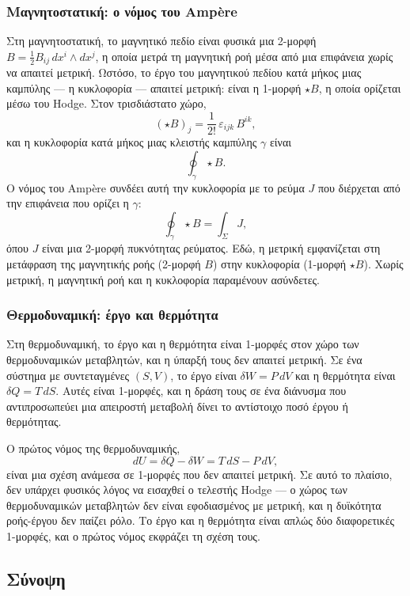 \documentclass[12pt]{article}
\begin{document}
\subsubsection{Μαγνητοστατική: ο νόμος του Amp\`ere}

Στη μαγνητοστατική, το μαγνητικό πεδίο είναι φυσικά μια 2-μορφή $B = \frac{1}{2} B_{ij} \, dx^i \wedge dx^j$, η οποία μετρά τη μαγνητική ροή μέσα από μια επιφάνεια χωρίς να απαιτεί μετρική. Ωστόσο, το έργο του μαγνητικού πεδίου κατά μήκος μιας καμπύλης — η κυκλοφορία — απαιτεί μετρική: είναι η 1-μορφή $\star B$, η οποία ορίζεται μέσω του Hodge. Στον τρισδιάστατο χώρο,
\[
(\star B)_j = \frac{1}{2!} \, \varepsilon_{ijk} \, B^{ik},
\]
και η κυκλοφορία κατά μήκος μιας κλειστής καμπύλης $\gamma$ είναι
\[
\oint_\gamma \star B.
\]
Ο νόμος του Amp\`ere συνδέει αυτή την κυκλοφορία με το ρεύμα $J$ που διέρχεται από την επιφάνεια που ορίζει η $\gamma$:
\[
\oint_\gamma \star B = \int_\Sigma J,
\]
όπου $J$ είναι μια 2-μορφή πυκνότητας ρεύματος. Εδώ, η μετρική εμφανίζεται στη μετάφραση της μαγνητικής ροής (2-μορφή $B$) στην κυκλοφορία (1-μορφή $\star B$). Χωρίς μετρική, η μαγνητική ροή και η κυκλοφορία παραμένουν ασύνδετες.

\subsubsection{Θερμοδυναμική: έργο και θερμότητα}

Στη θερμοδυναμική, το έργο και η θερμότητα είναι 1-μορφές στον χώρο των θερμοδυναμικών μεταβλητών, και η ύπαρξή τους δεν απαιτεί μετρική. Σε ένα σύστημα με συντεταγμένες $(S, V)$, το έργο είναι $\delta W = P \, dV$ και η θερμότητα είναι $\delta Q = T \, dS$. Αυτές είναι 1-μορφές, και η δράση τους σε ένα διάνυσμα που αντιπροσωπεύει μια απειροστή μεταβολή δίνει το αντίστοιχο ποσό έργου ή θερμότητας.

Ο πρώτος νόμος της θερμοδυναμικής,
\[
dU = \delta Q - \delta W = T \, dS - P \, dV,
\]
είναι μια σχέση ανάμεσα σε 1-μορφές που δεν απαιτεί μετρική. Σε αυτό το πλαίσιο, δεν υπάρχει φυσικός λόγος να εισαχθεί ο τελεστής Hodge — ο χώρος των θερμοδυναμικών μεταβλητών δεν είναι εφοδιασμένος με μετρική, και η δυϊκότητα ροής-έργου δεν παίζει ρόλο. Το έργο και η θερμότητα είναι απλώς δύο διαφορετικές 1-μορφές, και ο πρώτος νόμος εκφράζει τη σχέση τους.

\subsection{Σύνοψη}
\end{document}
